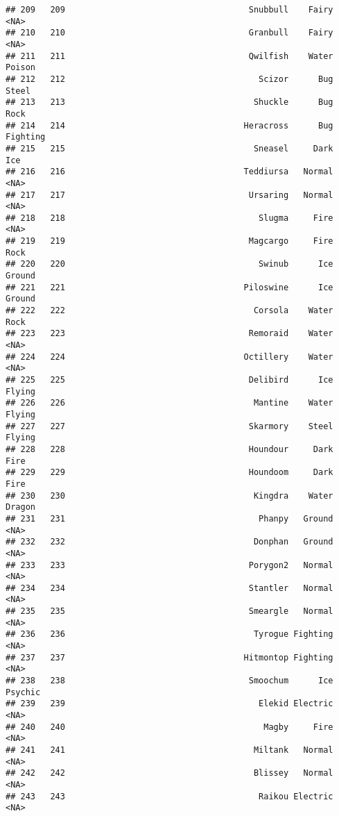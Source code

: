 \documentclass[
]{article}
\begin{document}
\begin{verbatim}
## 209   209                                     Snubbull    Fairy     <NA>
## 210   210                                     Granbull    Fairy     <NA>
## 211   211                                     Qwilfish    Water   Poison
## 212   212                                       Scizor      Bug    Steel
## 213   213                                      Shuckle      Bug     Rock
## 214   214                                    Heracross      Bug Fighting
## 215   215                                      Sneasel     Dark      Ice
## 216   216                                    Teddiursa   Normal     <NA>
## 217   217                                     Ursaring   Normal     <NA>
## 218   218                                       Slugma     Fire     <NA>
## 219   219                                     Magcargo     Fire     Rock
## 220   220                                       Swinub      Ice   Ground
## 221   221                                    Piloswine      Ice   Ground
## 222   222                                      Corsola    Water     Rock
## 223   223                                     Remoraid    Water     <NA>
## 224   224                                    Octillery    Water     <NA>
## 225   225                                     Delibird      Ice   Flying
## 226   226                                      Mantine    Water   Flying
## 227   227                                     Skarmory    Steel   Flying
## 228   228                                     Houndour     Dark     Fire
## 229   229                                     Houndoom     Dark     Fire
## 230   230                                      Kingdra    Water   Dragon
## 231   231                                       Phanpy   Ground     <NA>
## 232   232                                      Donphan   Ground     <NA>
## 233   233                                     Porygon2   Normal     <NA>
## 234   234                                     Stantler   Normal     <NA>
## 235   235                                     Smeargle   Normal     <NA>
## 236   236                                      Tyrogue Fighting     <NA>
## 237   237                                    Hitmontop Fighting     <NA>
## 238   238                                     Smoochum      Ice  Psychic
## 239   239                                       Elekid Electric     <NA>
## 240   240                                        Magby     Fire     <NA>
## 241   241                                      Miltank   Normal     <NA>
## 242   242                                      Blissey   Normal     <NA>
## 243   243                                       Raikou Electric     <NA>

\end{verbatim}
\end{document}
